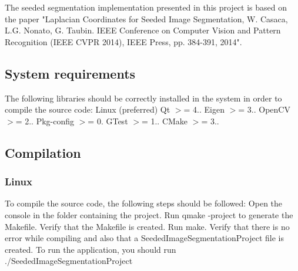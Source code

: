 The seeded segmentation implementation presented in this project is based on the paper "Laplacian Coordinates for Seeded Image Segmentation, W. Casaca, L.\-G. Nonato, G. Taubin. I\-E\-E\-E Conference on Computer Vision and Pattern Recognition (I\-E\-E\-E C\-V\-P\-R 2014), I\-E\-E\-E Press, pp. 384-\/391, 2014".

\subsection*{System requirements}

The following libraries should be correctly installed in the system in order to compile the source code\-: Linux (preferred) Qt $>$= 4.. Eigen $>$= 3.. Open\-C\-V $>$= 2.. Pkg-\/config $>$= 0. G\-Test $>$= 1.. C\-Make $>$= 3..

\subsection*{Compilation}

\subsubsection*{Linux}

To compile the source code, the following steps should be followed\-: Open the console in the folder containing the project. Run qmake -\/project to generate the Makefile. Verify that the Makefile is created. Run make. Verify that there is no error while compiling and also that a Seeded\-Image\-Segmentation\-Project file is created. To run the application, you should run ./\-Seeded\-Image\-Segmentation\-Project 